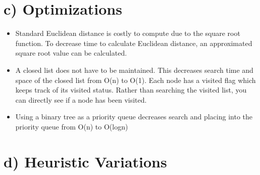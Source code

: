 \documentclass[a4paper]{article}
\begin{document}
\section*{c) Optimizations}
	\begin{itemize}
    \item Standard Euclidean distance is costly to compute due to the square root function. To decrease time to calculate Euclidean distance, an approximated square root value can be calculated.
    \item A closed list does not have to be maintained. This decreases search time and space of the closed list from O(n) to O(1). Each node has a visited flag which keeps track of its visited status. Rather than searching the visited list, you can directly see if a node has been visited.
    \item Using a binary tree as a priority queue decreases search and placing into the priority queue from O(n) to O(logn)
    \end{itemize}

\section*{d) Heuristic Variations}
\end{document}
